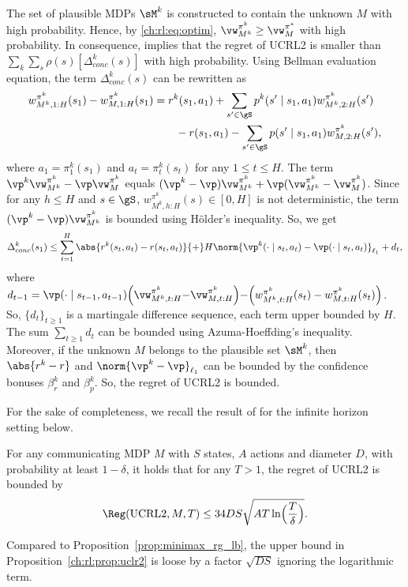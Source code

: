 The set of plausible MDPs $\sM^k$ is constructed to contain the unknown $M$ with high probability.
Hence, by \eqref{ch:rl:eq:optim}, $\vw^{\pi^k}_{M^k}\ge \vw^{\pi^*}_M$ with high probability. 
In consequence,  implies that the regret of UCRL2 is smaller than ${\sum_{k}\sum_{s}\rho(s)[\Delta_{conc}^k(s)]}$ with high probability.
Using Bellman evaluation equation, the term $\Delta_{conc}^k(s)$ can be rewritten as
\begin{align}
    w^{\pi^k}_{M^k,1:H}(s_1) -w^{\pi^k}_{M,1:H}(s_1)
    &= r^k(s_1,a_1)+\sum_{s'\in\gS}p^k(s'\mid s_1,a_1)w^{\pi^k}_{M^k,2:H}(s') \nonumber\\
    &\qquad -r(s_1,a_1)-\sum_{s'\in\gS}p(s'\mid s_1,a_1)w^{\pi^k}_{M,2:H}(s'), \label{eq:decom}
\end{align}
where $a_1=\pi^k_1(s_1)$ and $a_t=\pi^k_t(s_t)$ for any $1\le t\le H$.
The term $\vp^k\vw^{\pi^k}_{M^k}-\vp\vw^{\pi^k}_M$ equals $(\vp^k-\vp)\vw^{\pi^k}_{M^k} +\vp(\vw^{\pi^k}_{M^k}-\vw^{\pi^k}_M)$.
Since for any $h\le H$ and $s\in\gS$, $w^{\pi^k}_{M^k,h:H}(s)\in [0,H]$ is not deterministic, the term $(\vp^k-\vp)\vw^{\pi^k}_{M^k}$ is bounded using Hölder's inequality.
So, we get
\begin{equation}
    \label{ch:rl:eq:delta_conc}
    \Delta_{conc}^k(s_1)\le\sum_{t=1}^{H} \abs{r^k(s_t,a_t)-r(s_t,a_t)}{+}H\norm{\vp^k(\cdot\mid s_t,a_t)-\vp(\cdot\mid s_t,a_t)}_{\ell_1} +d_t,
\end{equation}
where $d_{t-1}=\vp(\cdot\mid s_{t{-}1},a_{t{-}1})\Bigl(\vw^{\pi^k}_{M^k,t:H} {-}\vw^{\pi^k}_{M,t:H}\Bigr) {-}\Bigl(w^{\pi^k}_{M^k,t:H}(s_{t}) -w^{\pi^k}_{M,t:H}(s_{t})\Bigr)$.
So, $\{d_t\}_{t\ge 1}$ is a martingale difference sequence, each term upper bounded by $H$.
The sum $\sum_{t\ge1}d_t$ can be bounded using Azuma-Hoeffding's inequality.
Moreover, if the unknown $M$ belongs to the plausible set $\sM^k$, then $\abs{r^k-r}$ and $\norm{\vp^k-\vp}_{\ell_1}$ can be bounded by the confidence bonuses $\beta_r^k$ and $\beta_p^k$.
So, the regret of UCRL2 is bounded.

For the sake of completeness, we recall the result of \cite{jaksch2010near} for the infinite horizon setting below.
\begin{prop}
    \label{ch:rl:prop:uclr2}
    For any communicating MDP $M$ with $S$ states, $A$ actions and diameter $D$, with probability at least $1-\delta$, it holds that for any $T>1$, the regret of UCRL2 is bounded by
    \begin{align*}
        \Reg(\textnormal{UCRL2}, M, T) \le 34DS\sqrt{AT\ln\Bigl(\frac{T}{\delta}\Bigr)}.
    \end{align*}
\end{prop}
Compared to Proposition~\ref{prop:minimax_rg_lb}, the upper bound in Proposition~\ref{ch:rl:prop:uclr2} is loose by a factor $\sqrt{DS}$ ignoring the logarithmic term.

